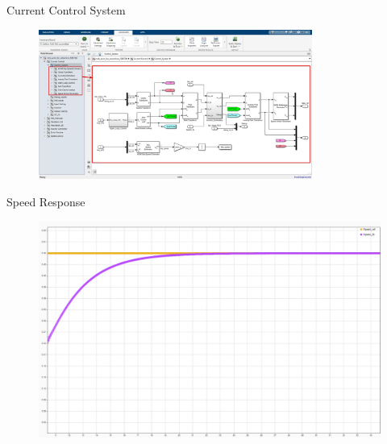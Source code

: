 \begin{frame}{Current Control System}
	\begin{figure}
		\centering
		\includegraphics[width=0.8\textwidth]{sections/section3/images/simulation/currentControl/controlSystem.png}
	\end{figure}
\end{frame}

\begin{frame}{Speed Response}
	\begin{figure}
		\centering
		\includegraphics[width=\textwidth]{sections/section3/images/simulationResutls/SpeedTrackingNoCursor.png}
	\end{figure}
\end{frame}

